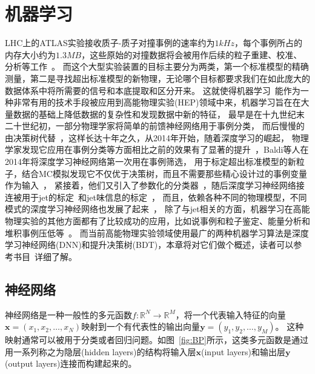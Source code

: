 
\chapter{机器学习}
\label{cha:ML}

LHC上的ATLAS实验接收质子-质子对撞事例的速率约为$1kHz$，每个事例所占的内存大小约为$1.3MB$，这些原始的对撞数据将会被用作后续的粒子重建、校准、分析等工作~\cite{PERF-2007-01}。
而这个大型实验装置的目标主要分为两类，第一个标准模型的精确测量，第二是寻找超出标准模型的新物理，无论哪个目标都要求我们在如此庞大的数据体系中将所需要的信号和本底提取和区分开来。
这就使得机器学习~\cite{RevModPhys.91.045002}能作为一种非常有用的技术手段被应用到高能物理实验(HEP)领域中来，机器学习旨在在大量数据的基础上降低数据的复杂性和发现数据中新的特征，
最早是在十九世纪末二十世纪初，一部分物理学家将简单的前馈神经网络用于事例分类，
而后慢慢的由决策树代替~\cite{JNN62,JNN63,JNN64}，这样长达十年之久，从2014年开始，随着深度学习的崛起，
物理学家发现它应用在事例分类等方面相比之前的效果有了显著的提升~\cite{JNN65,JNN66}，Baldi等人在2014年将深度学习神经网络第一次用在事例筛选，
用于标定超出标准模型的新粒子，结合MC模拟发现它不仅优于决策树，而且不需要那些精心设计过的事例变量作为输入~\cite{JNN67}，
紧接着，他们又引入了参数化的分类器~\cite{JNN68}，随后深度学习神经网络接连被用于jet的标定~\cite{JNN69,JNN70,JNN71}和jet味信息的标定~\cite{JNN72}，
而且，依赖各种不同的物理模型，不同模式的深度学习神经网络也发展了起来~\cite{JNN73,JNN74,JNN75,JNN76}，
除了与jet相关的方面，机器学习在高能物理实验的其他方面都有了比较成功的应用，比如说事例和粒子鉴定、能量分析和堆积事例压低等~\cite{Albertsson_2018}。
而当前高能物理实验领域使用最广的两种机器学习算法是深度学习神经网络(DNN)和提升决策树(BDT)，本章将对它们做个概述，读者可以参考书目~\cite{MLTsinghua,MLMIT}详细了解。


\section{神经网络}
\label{sec:NN}

神经网络是一种一般性的多元函数$f:	\mathbb{R}^N\rightarrow\mathbb{R}^M$，将一个代表输入特征的向量$\boldsymbol{x}=(x_1,x_2,	\dots,x_N)$映射到一个有代表性的输出向量$\boldsymbol{y}=(y_1,y_2,	\dots,y_M)$。
这种映射通常可以被用于分类或者回归问题。如图~\ref{fig:BP}所示，这类多元函数是通过用一系列称之为隐层(hidden layers)的结构将输入层$\boldsymbol{x}$(input layers)和输出层$\boldsymbol{y}$(output layers)连接而构建起来的。

